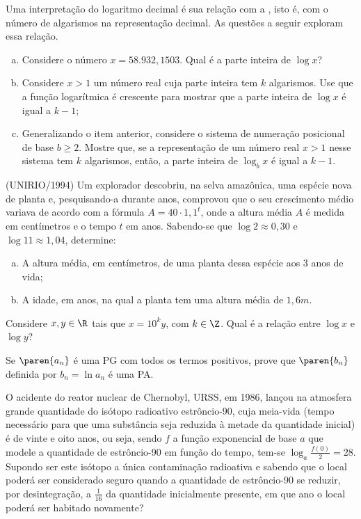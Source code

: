 \begin{exercise}
    Uma interpretação do logaritmo decimal é sua relação com a
, isto é, com o número de algarismos na
representação decimal. As questões a seguir exploram essa relação.
\begin{enumerate}[(a)]
  \item Considere o número $x = 58.932{,}1503$. Qual é a parte inteira de $\log x$?
  \item Considere $x>1$ um número real cuja parte inteira tem $k$ algarismos.
  Use que a função logarítmica é crescente para mostrar que a parte inteira
  de $\log x$ é igual a $k-1$;
  \item Generalizando o item anterior, considere o sistema de
  numeração posicional de base $b \geq 2$. Mostre que, se a
  representação de um número real $x>1$ nesse sistema tem $k$
  algarismos, então, a parte inteira de $\log_b x$ é igual a $k-1$.
\end{enumerate}
\end{exercise}

\begin{exercise}
    (UNIRIO/1994) Um explorador descobriu, na selva amazônica, uma
espécie nova de planta e, pesquisando-a durante anos, comprovou que
o seu crescimento médio variava de acordo com a fórmula $A = 40
\cdot 1{,}1^t$, onde a altura média $A$ é medida em centímetros e o
tempo $t$ em anos. Sabendo-se que $\log 2 \approx 0{,}30$ e $\log 11
\approx 1{,}04$, determine:
\begin{enumerate}[(a)]
  \item A altura média, em centímetros, de uma planta dessa espécie
  aos 3 anos de vida;
  \item A idade, em anos, na qual a planta tem uma altura média de
  $1{,}6 m$.
\end{enumerate}
\end{exercise}

\begin{exercise}
    Considere $x, y \in \R$ tais que $x = 10^k y$, com $k\in \Z$.
Qual é a relação entre $\log x $ e $\log y$?
\end{exercise}

\begin{exercise}
    Se $\paren{a_n}$ é uma PG com todos os termos positivos, prove
que $\paren{ b_n}$ definida por $b_n = \ln{a_n}$ é uma PA.
\end{exercise}

\begin{exercise}
    O acidente do reator nuclear de Chernobyl, URSS, em 1986, lançou
na atmosfera grande quantidade do isótopo radioativo estrôncio-90,
cuja meia-vida (tempo necessário para que uma substância seja
reduzida à metade da quantidade inicial) é de vinte e oito anos, ou
seja, sendo $f$  a função exponencial de base $a$ que modele a
quantidade de estrôncio-90 em função do tempo, tem-se $\log_a \frac
{f(0)} 2 = 28$. Supondo ser este isótopo a única contaminação
radioativa e sabendo que o local poderá ser considerado seguro
quando a quantidade de estrôncio-90 se reduzir, por desintegração, a
$\frac 1 {16}$ da quantidade inicialmente presente, em que ano o
local poderá ser habitado novamente?
\end{exercise}
